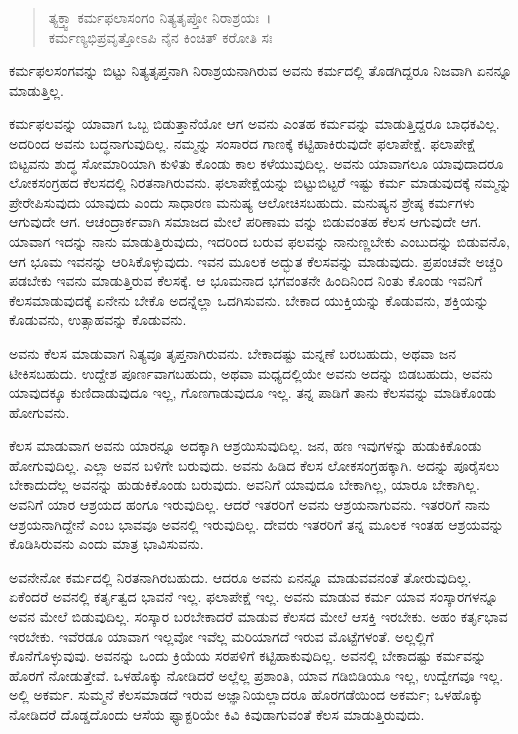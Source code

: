 \begin{verse}
ತ್ಯಕ್ತ್ವಾ ಕರ್ಮಫಲಾಸಂಗಂ ನಿತ್ಯತೃಪ್ತೋ ನಿರಾಶ್ರಯಃ~।\\ಕರ್ಮಣ್ಯಭಿಪ್ರವೃತ್ತೋಽಪಿ ನೈನ ಕಿಂಚಿತ್ ಕರೋತಿ ಸಃ 
\end{verse}

{\small ಕರ್ಮಫಲಸಂಗವನ್ನು ಬಿಟ್ಟು ನಿತ್ಯತೃಪ್ತನಾಗಿ ನಿರಾಶ್ರಯನಾಗಿರುವ ಅವನು ಕರ್ಮದಲ್ಲಿ ತೊಡಗಿದ್ದರೂ ನಿಜವಾಗಿ ಏನನ್ನೂ ಮಾಡುತ್ತಿಲ್ಲ.}

ಕರ್ಮಫಲವನ್ನು ಯಾವಾಗ ಒಬ್ಬ ಬಿಡುತ್ತಾನೆಯೋ ಆಗ ಅವನು ಎಂತಹ ಕರ್ಮವನ್ನು ಮಾಡುತ್ತಿದ್ದರೂ ಬಾಧಕವಿಲ್ಲ. ಅದರಿಂದ ಅವನು ಬದ್ಧನಾಗುವುದಿಲ್ಲ. ನಮ್ಮನ್ನು ಸಂಸಾರದ ಗಾಣಕ್ಕೆ ಕಟ್ಟಿಹಾಕಿರುವುದೇ ಫಲಾಪೇಕ್ಷೆ. ಫಲಾಪೇಕ್ಷೆ ಬಿಟ್ಟವನು ಶುದ್ಧ ಸೋಮಾರಿಯಾಗಿ ಕುಳಿತು ಕೊಂಡು ಕಾಲ ಕಳೆಯುವುದಿಲ್ಲ. ಅವನು ಯಾವಾಗಲೂ ಯಾವುದಾದರೂ ಲೋಕಸಂಗ್ರಹದ ಕೆಲಸದಲ್ಲಿ ನಿರತನಾಗಿರುವನು. ಫಲಾಪೇಕ್ಷೆಯನ್ನು ಬಿಟ್ಟುಬಿಟ್ಟರೆ ಇಷ್ಟು ಕರ್ಮ ಮಾಡುವುದಕ್ಕೆ ನಮ್ಮನ್ನು ಪ್ರೇರೇಪಿಸುವುದು ಯಾವುದು ಎಂದು ಸಾಧಾರಣ ಮನುಷ್ಯ ಆಲೋಚಿಸಬಹುದು. ಮನುಷ್ಯನ ಶ್ರೇಷ್ಠ ಕರ್ಮಗಳು ಆಗುವುದೇ ಆಗ. ಆಚಂದ್ರಾರ್ಕವಾಗಿ ಸಮಾಜದ ಮೇಲೆ ಪರಿಣಾಮ ವನ್ನು ಬಿಡುವಂತಹ ಕೆಲಸ ಆಗುವುದೇ ಆಗ. ಯಾವಾಗ ಇದನ್ನು ನಾನು ಮಾಡುತ್ತಿರುವುದು, ಇದರಿಂದ ಬರುವ ಫಲವನ್ನು ನಾನುಣ್ಣಬೇಕು ಎಂಬುದನ್ನು ಬಿಡುವನೊ, ಆಗ ಭೂಮ ಇವನನ್ನು ಆರಿಸಿಕೊಳ್ಳುವುದು. ಇವನ ಮೂಲಕ ಅದ್ಭುತ ಕೆಲಸವನ್ನು ಮಾಡುವುದು. ಪ್ರಪಂಚವೇ ಅಚ್ಚರಿ ಪಡಬೇಕು ಇವನು ಮಾಡುತ್ತಿರುವ ಕೆಲಸಕ್ಕೆ. ಆ ಭೂಮನಾದ ಭಗವಂತನೇ ಹಿಂದಿನಿಂದ ನಿಂತು ಕೊಂಡು ಇವನಿಗೆ ಕೆಲಸಮಾಡುವುದಕ್ಕೆ ಏನೇನು ಬೇಕೊ ಅದನ್ನೆಲ್ಲಾ ಒದಗಿಸುವನು. ಬೇಕಾದ ಯುಕ್ತಿಯನ್ನು ಕೊಡುವನು, ಶಕ್ತಿಯನ್ನು ಕೊಡುವನು, ಉತ್ಸಾಹವನ್ನು ಕೊಡುವನು.

ಅವನು ಕೆಲಸ ಮಾಡುವಾಗ ನಿತ್ಯವೂ ತೃಪ್ತನಾಗಿರುವನು. ಬೇಕಾದಷ್ಟು ಮನ್ನಣೆ ಬರಬಹುದು, ಅಥವಾ ಜನ ಟೀಕಿಸಬಹುದು. ಉದ್ದೇಶ ಪೂರ್ಣವಾಗಬಹುದು, ಅಥವಾ ಮಧ್ಯದಲ್ಲಿಯೇ ಅವನು ಅದನ್ನು ಬಿಡಬಹುದು, ಅವನು ಯಾವುದಕ್ಕೂ ಕುಣಿದಾಡುವುದೂ ಇಲ್ಲ, ಗೊಣಗಾಡುವುದೂ ಇಲ್ಲ. ತನ್ನ ಪಾಡಿಗೆ ತಾನು ಕೆಲಸವನ್ನು ಮಾಡಿಕೊಂಡು ಹೋಗುವನು.

ಕೆಲಸ ಮಾಡುವಾಗ ಅವನು ಯಾರನ್ನೂ ಅದಕ್ಕಾಗಿ ಆಶ್ರಯಿಸುವುದಿಲ್ಲ. ಜನ, ಹಣ ಇವುಗಳನ್ನು ಹುಡುಕಿಕೊಂಡು ಹೋಗುವುದಿಲ್ಲ. ಎಲ್ಲಾ ಅವನ ಬಳಿಗೇ ಬರುವುದು. ಅವನು ಹಿಡಿದ ಕೆಲಸ ಲೋಕಸಂಗ್ರಹಕ್ಕಾಗಿ. ಅದನ್ನು ಪೂರೈಸಲು ಬೇಕಾದುದೆಲ್ಲ ಅವನನ್ನು ಹುಡುಕಿಕೊಂಡು ಬರುವುದು. ಅವನಿಗೆ ಯಾವುದೂ ಬೇಕಾಗಿಲ್ಲ, ಯಾರೂ ಬೇಕಾಗಿಲ್ಲ. ಅವನಿಗೆ ಯಾರ ಆಶ್ರಯದ ಹಂಗೂ ಇರುವುದಿಲ್ಲ. ಆದರೆ ಇತರರಿಗೆ ಅವನು ಆಶ್ರಯನಾಗುವನು. ಇತರರಿಗೆ ನಾನು ಆಶ್ರಯನಾಗಿದ್ದೇನೆ ಎಂಬ ಭಾವವೂ ಅವನಲ್ಲಿ ಇರುವುದಿಲ್ಲ. ದೇವರು ಇತರರಿಗೆ ತನ್ನ ಮೂಲಕ ಇಂತಹ ಆಶ್ರಯವನ್ನು ಕೊಡಿಸಿರುವನು ಎಂದು ಮಾತ್ರ ಭಾವಿಸುವನು.

ಅವನೇನೋ ಕರ್ಮದಲ್ಲಿ ನಿರತನಾಗಿರಬಹುದು. ಆದರೂ ಅವನು ಏನನ್ನೂ ಮಾಡುವವನಂತೆ ತೋರುವುದಿಲ್ಲ. ಏಕೆಂದರೆ ಅವನಲ್ಲಿ ಕರ್ತೃತ್ವದ ಭಾವನೆ ಇಲ್ಲ. ಫಲಾಪೇಕ್ಷೆ ಇಲ್ಲ. ಅವನು ಮಾಡುವ ಕರ್ಮ ಯಾವ ಸಂಸ್ಕಾರಗಳನ್ನೂ ಅವನ ಮೇಲೆ ಬಿಡುವುದಿಲ್ಲ. ಸಂಸ್ಕಾರ ಬರಬೇಕಾದರೆ ಮಾಡುವ ಕೆಲಸದ ಮೇಲೆ ಆಸಕ್ತಿ ಇರಬೇಕು. ಅಹಂ ಕರ್ತೃಭಾವ ಇರಬೇಕು. ಇವೆರಡೂ ಯಾವಾಗ ಇಲ್ಲವೋ ಇವೆಲ್ಲ ಮರಿಯಾಗದೆ ಇರುವ ಮೊಟ್ಟೆಗಳಂತೆ. ಅಲ್ಲಲ್ಲಿಗೆ ಕೊನೆಗೊಳ್ಳುವುವು. ಅವನನ್ನು ಒಂದು ಕ್ರಿಯೆಯ ಸರಪಳಿಗೆ ಕಟ್ಟಿಹಾಕುವುದಿಲ್ಲ. ಅವನಲ್ಲಿ ಬೇಕಾದಷ್ಟು ಕರ್ಮವನ್ನು ಹೊರಗೆ ನೋಡುತ್ತೇವೆ. ಒಳಹೊಕ್ಕು ನೋಡಿದರೆ ಅಲ್ಲೆಲ್ಲ ಪ್ರಶಾಂತಿ, ಯಾವ ಗಡಿಬಿಡಿಯೂ ಇಲ್ಲ, ಉದ್ವೇಗವೂ ಇಲ್ಲ. ಅಲ್ಲಿ ಅಕರ್ಮ. ಸುಮ್ಮನೆ ಕೆಲಸಮಾಡದೆ ಇರುವ ಅಜ್ಞಾನಿಯಲ್ಲಾದರೂ ಹೊರಗಡೆಯಿಂದ ಅಕರ್ಮ; ಒಳಹೊಕ್ಕು ನೋಡಿದರೆ ದೊಡ್ಡದೊಂದು ಆಸೆಯ ಫ್ಯಾಕ್ಟರಿಯೇ ಕಿವಿ ಕಿವುಡಾಗುವಂತೆ ಕೆಲಸ ಮಾಡುತ್ತಿರುವುದು.

